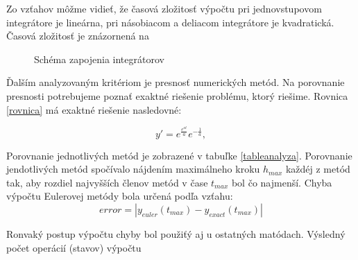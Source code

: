 Zo vzťahov môžme vidieť, že časová zložitosť výpočtu pri jednovstupovom integrátore je lineárna, pri násobiacom a deliacom integrátore je kvadratická. Časová zložitosť je znázornená na 



\begin{figure}[H]
\centering
{}
\caption{Schéma zapojenia integrátorov}
\label{a}
\end{figure}


Ďalším analyzovaným kritériom je presnosť numerických metód. Na porovnanie presnosti potrebujeme poznať exaktné riešenie problému, ktorý riešime. Rovnica \ref{rovnica} má exaktné riešenie nasledovné:

\begin{equation}
y' = e^{\frac{e^{at}}{a}} e^{-\frac{1}{a}} ,
\end{equation}
\bigskip


Porovnanie jednotlivých metód je zobrazené v tabuľke \ref{tableanalyza}. Porovnanie jendotlivých metód spočívalo nájdením maximálneho kroku $ h_{max} $ každéj z metód tak, aby rozdiel najvyšších členov metód v čase $ t_{max} $ bol čo najmenší. Chyba výpočtu Eulerovej metódy bola určená podľa vzťahu:
\begin{equation}
error = |y_{euler}(t_{max}) - y_{exact}(t_{max})|
\end{equation}
\bigskip

Ronvaký postup výpočtu chyby bol použiťý aj u ostatných matódach. Výsledný počet operácií (stavov) výpočtu 





